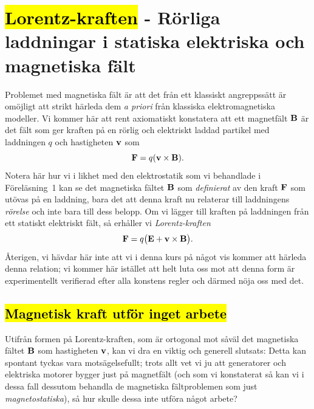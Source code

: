 \section{{\hl{Lorentz-kraften}} - R{\"o}rliga laddningar i statiska elektriska
  och magnetiska f{\"a}lt}
\noindent
Problemet med magnetiska f{\"a}lt {\"a}r att det fr{\aa}n ett klassiskt
angreppss{\"a}tt {\"a}r om{\"o}jligt att strikt h{\"a}rleda dem {\it a priori}
fr{\aa}n klassiska elektromagnetiska modeller. Vi kommer h{\"a}r att rent
axiomatiskt konstatera att ett magnetf{\"a}lt ${\bf B}$ {\"a}r det f{\"a}lt
som ger kraften p{\aa} en r{\"o}rlig och elektriskt laddad partikel med
laddningen $q$ och hastigheten ${\bf v}$ som
$$
  {\bf F}=q({\bf v}\times{\bf B}).
$$
Notera h{\"a}r hur vi i likhet med den elektrostatik som vi behandlade
i F{\"o}rel{\"a}sning~1 kan se det magnetiska f{\"a}ltet ${\bf B}$ som
{\it definierat} av den kraft ${\bf F}$ som ut{\"o}vas p{\aa} en laddning,
bara det att denna kraft nu relaterar till laddningens {\it r{\"o}relse}
och inte bara till dess belopp.
Om vi l{\"a}gger till kraften p{\aa} laddningen fr{\aa}n ett statiskt elektriskt
f{\"a}lt, s{\aa} erh{\aa}ller vi {\it Lorentz-kraften}
\hl{$$
  {\bf F}=q\big({\bf E}+{\bf v}\times{\bf B}\big).
$$}
{\AA}terigen, vi h{\"a}vdar h{\"a}r inte att vi i denna kurs p{\aa} n{\aa}got
vis kommer att h{\"a}rleda denna relation; vi kommer h{\"a}r ist{\"a}llet att
helt luta oss mot att denna form {\"a}r experimentellt verifierad efter alla
konstens regler och d{\"a}rmed n{\"o}ja oss med det.

\subsection{{\hl{Magnetisk kraft utf{\"o}r inget arbete}}}
Utifr{\aa}n formen p{\aa} Lorentz-kraften, som {\"a}r ortogonal mot
s{\aa}v{\"a}l det magnetiska f{\"a}ltet ${\bf B}$ som hastigheten ${\bf v}$,
kan vi dra en viktig och generell slutsats:
\noindent
Detta kan spontant tyckas vara mots{\"a}gelsefullt; trots allt vet vi ju att
generatorer och elektriska motorer bygger just p{\aa} magnetf{\"a}lt (och som
vi konstaterat s{\aa} kan vi i dessa fall dessutom behandla de magnetiska
f{\"a}ltproblemen som just {\it magnetostatiska}), s{\aa} hur skulle dessa
inte utf{\"o}ra n{\aa}got arbete?

